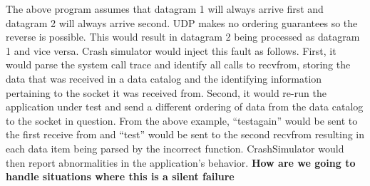     The above program assumes that datagram 1 will always arrive first and datagram 2 will always arrive second. UDP
    makes no ordering guarantees so the reverse is possible. This would result in datagram 2 being processed as datagram
    1 and vice versa. Crash simulator would inject this fault as follows. First, it would parse the system call trace
    and identify all calls to recvfrom, storing the data that was received in a data catalog and the identifying
    information pertaining to the socket it was received from. Second, it would re-run the application under test and
    send a different ordering of data from the data catalog to the socket in question. From the above example,
    ``testagain'' would be sent to the first receive from and ``test'' would be sent to the second recvfrom resulting in
    each data item being parsed by the incorrect function. CrashSimulator would then report abnormalities in the
    application's behavior. \textbf{How are we going to handle situations where this is a silent failure}

